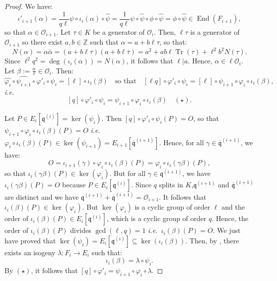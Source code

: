 \documentclass[a4paper,10pt]{report}
\theoremstyle{definition}
\theoremstyle{plain}
\theoremstyle{definition}
\newcommand{\ie}{\emph{i.e.}\ }
\newcommand{\Z}{\mathbb{Z}}
\newcommand{\mO}{\mathcal{O}}
\renewcommand{\(}{\left(}
\renewcommand{\)}{\right)}
\newcommand{\mfq}{\mathfrak{q}}
\DeclareMathOperator{\End}{End}
\DeclareMathOperator{\Tr}{Tr}
\begin{document}
\begin{proof}
We have:
\[\iota'_{i+1}(\alpha)=\frac{1}{q\ell}\psi\circ\iota_i(\alpha)\circ\widehat{\psi}=\frac{1}{q\ell}\psi\circ \widehat{\psi}\circ\phi\circ\widehat{\psi}=\phi\circ\widehat{\psi}\in \End(F_{i+1}),\]
so that $\alpha\in \mO_{i+1}$. Let $\tau\in K$ be a generator of $\mO_i$. Then, $\ell\tau$ is a generator of $\mO_{i+1}$ so there exist $a,b\in\Z$ such that $\alpha=a+b\ell\tau$, so that:
\[N(\alpha)=\alpha\overline{\alpha}=(a+b\ell\tau)(a+b\ell\overline{\tau})=a^2+ab\ell\Tr(\tau)+\ell^2b^2N(\tau).\]
Since $\ell^2q^2=\deg(\iota_i(\alpha))=N(\alpha)$, it follows that $\ell|a$. Hence, $\alpha\in\ell\mO_i$.  Let $\beta:=\frac{\alpha}{\ell}\in\mO_i$.  Then:
\[\widehat{\varphi_i}\circ\widehat{\psi_{i+1}}\circ\varphi'_i\circ\psi_i=[\ell]\circ\iota_i(\beta)\quad\mbox{so that} \quad [\ell q]\circ\varphi'_i\circ\psi_i=[\ell]\circ\psi_{i+1}\circ\varphi_i\circ\iota_i(\beta),\]
\ie
\[[q]\circ\varphi'_i\circ\psi_i=\psi_{i+1}\circ\varphi_i\circ\iota_i(\beta)\quad (\star).\]

Let $P\in E_i[\mfq^{(i)}]=\ker(\psi_i)$.  Then $[q]\circ\varphi'_i\circ\psi_i(P)=O$, so that $\psi_{i+1}\circ\varphi_i\circ\iota_i(\beta)(P)=O$ \ie $\varphi_i\circ\iota_i(\beta)(P)\in\ker(\psi_{i+1})=E_{i+1}[\overline{\mfq}^{(i+1)}]$. Hence, for all $\gamma\in\overline{\mfq}^{(i+1)}$, we have:
\[O=\iota_{i+1}(\gamma)\circ\varphi_i\circ\iota_i(\beta)(P)=\varphi_i\circ\iota_i(\gamma\beta)(P),\]
so that $\iota_i(\gamma\beta)(P)\in\ker(\varphi_i)$. But for all $\gamma\in\mfq^{(i+1)}$, we have $\iota_i(\gamma\beta)(P)=O$ because $P\in E_i[\mfq^{(i)}]$.  Since $q$ splits in $K$,$\mfq^{(i+1)}$ and $\overline{\mfq}^{(i+1)}$ are distinct and we have $\mfq^{(i+1)}+\overline{\mfq}^{(i+1)}=\mO_{i+1}$. It follows that $\iota_i(\beta)(P)\in\ker(\varphi_i)$. But $\ker(\varphi_i)$ is a cyclic group of order $\ell$ and the order of $\iota_i(\beta)(P)\in E_i[\mfq^{(i)}]$, which is a cyclic group of order $q$. Hence, the order of $\iota_i(\beta)(P)$ divides $\gcd(\ell,q)=1$ \ie $\iota_i(\beta)(P)=O$.  We just have proved that $\ker(\psi_i)=E_i[\mfq^{(i)}]\subseteq\ker(\iota_i(\beta))$. Then, by \cite[Corollary III.4.11]{Silverman1}, there exists an isogeny $\lambda : F_i\longrightarrow E_i$ such that: 
\[\iota_i(\beta)=\lambda\circ\psi_i.\]
By $(\star)$,  it follows that $[q]\circ\varphi'_i=\psi_{i+1}\circ\varphi_i\circ\lambda$. 


\end{proof}
\end{document}
